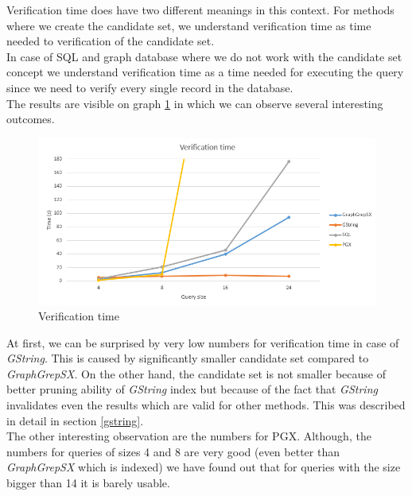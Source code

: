 Verification time does have two different meanings in this context. For methods where we create the candidate set, we understand verification time as time needed to verification of the candidate set.\\

In case of SQL and graph database where we do not work with the candidate set concept we understand verification time as a time needed for executing the query since we need to verify every single record in the database.\\

The results are visible on graph \ref{fig:verification} in which we can observe several interesting outcomes.\\

\begin{figure}[h]
	\centering
	\includegraphics[width=1\textwidth]{../img/verification.png}
	\caption{Verification time}
	\label{fig:verification}
\end{figure}

At first, we can be surprised by very low numbers for verification time in case of \textit{GString}. This is caused by significantly smaller candidate set compared to \textit{GraphGrepSX}. On the other hand, the candidate set is not smaller because of better pruning ability of \textit{GString} index but because of the fact that \textit{GString} invalidates even the results which are valid for other methods. This was described in detail in section \ref{gstring}.\\

The other interesting observation are the numbers for PGX. Although, the numbers for queries of sizes 4 and 8 are very good (even better than \textit{GraphGrepSX} which is indexed) we have found out that for queries with the size bigger than 14 it is barely usable.\\

